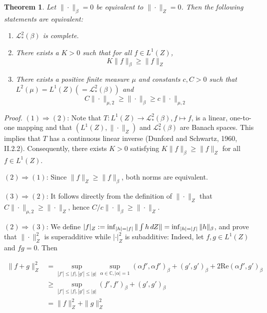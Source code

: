 \documentclass{article}
\newcommand{\assign}{:=}
\newcommand{\cdummy}{\cdot}
\newcommand{\tmem}[1]{{\em #1\/}}
\newtheorem{theorem}{Theorem}
\begin{document}
\begin{theorem}
  Let $\| \cdummy \|_{\beta} = 0$ be equivalent to $\| \cdummy \|_Z = 0$. Then
  the following statements are equivalent:
  \begin{enumerate}
    \item $\mathscr{L}_{\ast}^2 (\beta)$ is complete.
    
    \item There exists a $K > 0$ such that for all $f \in L^1 (Z)$,
    \begin{equation}
      K \|f\|_{\beta} \geq \|f\|_Z
    \end{equation}
    \item There exists a positive finite measure $\mu$ and constants $c, C >
    0$ such that $L^2 (\mu) = L^1 (Z) (= \mathscr{L}_{\ast}^2 (\beta))$ and
    \begin{equation}
      C \| \cdummy \|_{\mu, 2} \geq \| \cdummy \|_{\beta} \geq c \| \cdummy
      \|_{\mu, 2}
    \end{equation}
  \end{enumerate}
\end{theorem}

{\tmem{Proof.}} $(1) \Rightarrow (2)$: Note that $T : L^1 (Z) \to
\mathscr{L}_{\ast}^2 (\beta), f \mapsto f$, is a linear, one-to-one mapping
and that $(L^1 (Z), \| \cdot \|_Z)$ and $\mathscr{L}_{\ast}^2 (\beta)$ are
Banach spaces. This implies that $T$ has a continuous linear inverse (Dunford
and Schwartz, 1960, II.2.2). Consequently, there exists $K > 0$ satisfying $K
\|f\|_{\beta} \geq \|f\|_Z$ for all $f \in L^1 (Z)$.

$(2) \Rightarrow (1)$: Since $\|f\|_Z \geq \|f\|_{\beta}$, both norms are
equivalent.

$(3) \Rightarrow (2)$: It follows directly from the definition of $\| \cdummy
\|_Z$ that $C \| \cdummy \|_{\mu, 2} \geq \| \cdummy \|_Z$, hence $C / c \|
\cdummy \|_{\beta} \geq \| \cdummy \|_Z$.

$(2) \Rightarrow (3)$: We define $|f|_Z \assign \inf_{|h| = |f|} \| \int h
\hspace{0.17em} dZ\| = \inf_{|h| = |f|} \|h\|_{\beta}$, and prove that $\|
\cdummy \|_Z^2$ is superadditive while $| \cdummy |_Z^2$ is subadditive:
Indeed, let $f, g \in L^1 (Z)$ and $fg = 0$. Then

\begin{align}
  \|f + g\|_Z^2 & = \sup_{|f' | \leq |f|, |g' | \leq |g|} \sup_{\alpha \in
  \mathbb{C}, | \alpha | = 1} (\alpha f', \alpha f')_{\beta} + (g',
  g')_{\beta} + 2 \mathrm{Re} (\alpha f', g')_{\beta} \\
  & \geq \sup_{|f' | \leq |f|, |g' | \leq |g|} (f', f')_{\beta} + (g',
  g')_{\beta} \\
  & = \|f\|_Z^2 + \|g\|_Z^2 
\end{align}
\end{document}
